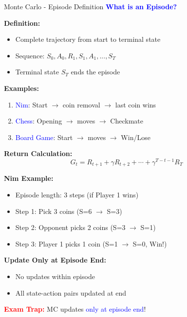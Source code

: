 \documentclass[8pt]{beamer}
\begin{document}
\begin{frame}{Monte Carlo - Episode Definition}
\fontsize{6.5}{7.5}\selectfont
\textcolor{blue}{\textbf{What is an Episode?}}

\textbf{Definition:}
\begin{itemize}
\item Complete trajectory from start to terminal state
\item Sequence: $S_0, A_0, R_1, S_1, A_1, ..., S_T$
\item Terminal state $S_T$ ends the episode
\end{itemize}

\textbf{Examples:}
\begin{enumerate}
\item \textcolor{blue}{Nim}: Start $\rightarrow$ coin removal $\rightarrow$ last coin wins
\item \textcolor{blue}{Chess}: Opening $\rightarrow$ moves $\rightarrow$ Checkmate
\item \textcolor{blue}{Board Game}: Start $\rightarrow$ moves $\rightarrow$ Win/Lose
\end{enumerate}

\textbf{Return Calculation:}
\[
G_t = R_{t+1} + \gamma R_{t+2} + \cdots + \gamma^{T-t-1}R_T
\]

\textbf{Nim Example:}
\begin{itemize}
\item Episode length: 3 steps (if Player 1 wins)
\item Step 1: Pick 3 coins (S=6 $\rightarrow$ S=3)
\item Step 2: Opponent picks 2 coins (S=3 $\rightarrow$ S=1)
\item Step 3: Player 1 picks 1 coin (S=1 $\rightarrow$ S=0, Win!)
\end{itemize}

\textbf{Update Only at Episode End:}
\begin{itemize}
\item No updates within episode
\item All state-action pairs updated at end
\end{itemize}

\textcolor{red}{\textbf{Exam Trap:}} MC updates \textcolor{blue}{only at episode end}!
\end{frame}
\end{document}
